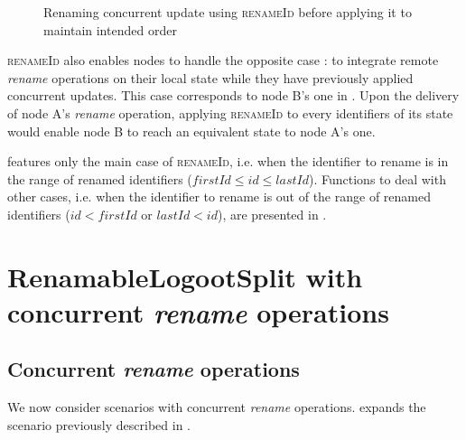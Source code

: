 \documentclass[10pt,journal,compsoc]{IEEEtran}
\let\MYoriglatexcaption\caption
\renewcommand{\caption}[2][\relax]{\MYoriglatexcaption[#2]{#2}}
\newcommand{\ie}{i.e. }
\newcommand{\trm}[1]{\mathit{#1}}
\begin{document}
\begin{figure}[!ht]
\begin{tikzpicture}
    \end{tikzpicture}
    \caption{Renaming concurrent update using \textsc{renameId} before applying it to maintain intended order}
    \label{fig:concurrent-insert-rename-fixed}
\end{figure}

\textsc{renameId} also enables nodes to handle the opposite case : to integrate remote \emph{rename} operations on their local state while they have previously applied concurrent updates.
This case corresponds to node B's one in .
Upon the delivery of node A's \emph{rename} operation, applying \textsc{renameId} to every identifiers of its state would enable node B to reach an equivalent state to node A's one.

 features only the main case of \textsc{renameId}, \ie when the identifier to rename is in the range of renamed identifiers ($\trm{firstId} \leq \trm{id} \leq \trm{lastId}$).
Functions to deal with other cases, \ie when the identifier to rename is out of the range of renamed identifiers ($\trm{id} < \trm{firstId}$ or $\trm{lastId} < \trm{id}$), are presented in .

\section{RenamableLogootSplit with concurrent \emph{rename} operations}

\label{sec:distributed-rls}

\subsection{Concurrent \emph{rename} operations}

We now consider scenarios with concurrent \emph{rename} operations.
 expands the scenario previously described in .
\end{document}
